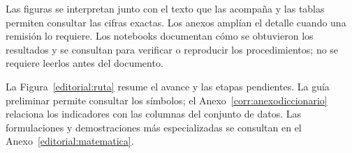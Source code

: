 Las figuras se interpretan junto con el texto que las acompaña y las tablas permiten consultar las cifras exactas. Los anexos amplían el detalle cuando una remisión lo requiere. Los notebooks documentan cómo se obtuvieron los resultados y se consultan para verificar o reproducir los procedimientos; no se requiere leerlos antes del documento.

La Figura~\ref{editorial:ruta} resume el avance y las etapas pendientes. La guía preliminar permite consultar los símbolos; el Anexo~\ref{corr:anexodiccionario} relaciona los indicadores con las columnas del conjunto de datos. Las formulaciones y demostraciones más especializadas se consultan en el Anexo~\ref{editorial:matematica}.



